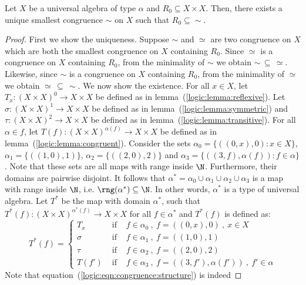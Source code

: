 \begin{theorem}\label{logic:the:generated:congruence}
Let $X$ be a universal algebra of type $\alpha$ and $R_{0}\subseteq
X\times X$. Then, there exists a unique smallest congruence $\sim$
on $X$ such that $R_{0}\subseteq\sim$.
\end{theorem}
\begin{proof}
First we show the uniqueness. Suppose $\sim$ and $\simeq$ are two
congruence on $X$ which are both the smallest congruence on $X$
containing $R_{0}$. Since $\simeq$ is a congruence on $X$ containing
$R_{0}$, from the minimality of $\sim$ we obtain
$\sim\,\subseteq\,\simeq$. Likewise, since $\sim$ is a congruence on
$X$ containing $R_{0}$, from the minimality of $\simeq$ we obtain
$\simeq\,\subseteq\,\sim$. We now show the existence. For all $x\in
X$, let  $T_{x}:(X\times X)^{0}\to X\times X$ be defined as in
lemma~(\ref{logic:lemma:reflexive}). Let $\sigma:(X\times X)^{1}\to
X\times X$ be defined as in lemma~(\ref{logic:lemma:symmetric}) and
$\tau:(X\times X)^{2}\to X\times X$ be defined as in
lemma~(\ref{logic:lemma:transitive}). For all $\alpha\in f$, let
$T(f):(X\times X)^{\alpha(f)}\to X\times X$ be defined as in
lemma~(\ref{logic:lemma:congruent}). Consider the sets
$\alpha_{0}=\{((0,x),0):x\in X\}$, $\alpha_{1}=\{((1,0),1)\}$,
$\alpha_{2}=\{((2,0),2)\}$ and
$\alpha_{3}=\{((3,f),\alpha(f)):f\in\alpha\}$. Note that these sets
are all maps with range inside $\N$. Furthermore, their domains are
pairwise disjoint. It follows that
$\alpha^{*}=\alpha_{0}\cup\alpha_{1}\cup\alpha_{2}\cup\alpha_{3}$ is
a map with range inside $\N$, i.e. $\rng(\alpha^{*})\subseteq\N$. In
other words, $\alpha^{*}$ is a type of universal algebra. Let
$T^{*}$ be the map with domain $\alpha^{*}$, such that
$T^{*}(f):(X\times X)^{\alpha^{*}(f)}\to X\times X$ for all
$f\in\alpha^{*}$ and $T^{*}(f)$ is defined as:
    \begin{equation}\label{logic:eqn:congruence:structure}
    T^{*}(f)=\left\{\begin{array}{lcl}
        T_{x}&\mbox{\ if\ }&f\in\alpha_{0}\ ,\ f=((0,x),0)\ ,\ x\in X\\
        \sigma&\mbox{\ if\ }&f\in\alpha_{1}\ ,\ f=((1,0),1)\\
        \tau&\mbox{\ if\ }&f\in\alpha_{2}\ ,\ f=((2,0),2)\\
        T(f')&\mbox{\ if\ }&f\in\alpha_{3}\ ,\ f=((3,f'),\alpha(f'))\ ,\ f'\in\alpha
    \end{array}\right.
    \end{equation}
Note that equation~(\ref{logic:eqn:congruence:structure}) is indeed

\end{proof}
